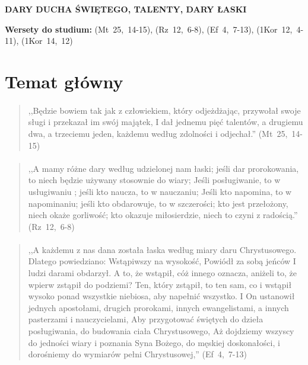 \documentclass[10pt,a4paper,oneside]{article}
\begin{document}
\centerline{\textbf{\MakeUppercase{Dary Ducha Świętego, talenty, dary łaski}}}
\begin{center}
\textbf{Wersety do studium:} \mbox{(Mt 25, 14-15)}, \mbox{(Rz 12, 6-8)}, \mbox{(Ef 4, 7-13)}, \mbox{(1Kor 12, 4-11)}, \mbox{(1Kor 14, 12)}
\end{center}
\section{Temat główny}
\paragraph{}
\begin{quote}
,,Będzie bowiem tak jak z człowiekiem, który odjeżdżając, przywołał swoje sługi i przekazał im swój majątek, I dał jednemu pięć talentów, a drugiemu dwa, a trzeciemu jeden, każdemu według zdolności i odjechał.'' \mbox{(Mt 25, 14-15)}
\end{quote}
\paragraph{}
\begin{quote}
,,A mamy różne dary według udzielonej nam łaski; jeśli dar prorokowania, to niech będzie używany stosownie do wiary; Jeśli posługiwanie, to w usługiwaniu ; jeśli kto naucza, to w nauczaniu; Jeśli kto napomina, to w napominaniu; jeśli kto obdarowuje, to w szczerości; kto jest przełożony, niech okaże gorliwość; kto okazuje miłosierdzie, niech to czyni z radością.'' \mbox{(Rz 12, 6-8)}
\end{quote}
\paragraph{}
\begin{quote}
,,A każdemu z nas dana została łaska według miary daru Chrystusowego. Dlatego powiedziano: Wstąpiwszy na wysokość, Powiódł za sobą jeńców I ludzi darami obdarzył. A to, że wstąpił, cóż innego oznacza, aniżeli to, że wpierw zstąpił do podziemi? Ten, który zstąpił, to ten sam, co i wstąpił wysoko ponad wszystkie niebiosa, aby napełnić wszystko. I On ustanowił jednych apostołami, drugich prorokami, innych ewangelistami, a innych pasterzami i nauczycielami, Aby przygotować świętych do dzieła posługiwania, do budowania ciała Chrystusowego, Aż dojdziemy wszyscy do jedności wiary i poznania Syna Bożego, do męskiej doskonałości, i dorośniemy do wymiarów pełni Chrystusowej,'' \mbox{(Ef 4, 7-13)}
\end{quote}
\end{document}
